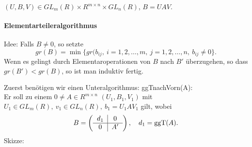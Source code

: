 \documentclass[a4paper,twoside,DIV15,BCOR12mm]{scrbook}
\begin{document}

$(U,B,V) \in GL_m(R) \times R^{m\times n} \times GL_n(R)$, $B=UAV$.
\paragraph{Elementarteileralgorithmus} Idee: Falls $B \neq 0$, so
setzte
\[
    gr(B)=\min\{gr(b_{ij},\ i=1,2,\dotsc,m,\ j=1,2,\dotsc,n,\
    b_{ij}\neq 0 \}.
\]
Wenn es gelingt durch Elementaroperationen von $B$ nach $B'$
überzugehen, so dass $gr(B')<gr(B)$, so ist man induktiv fertig.

Zuerst benötigen wir einen Unteralgorithmus: ggTnachVorn(A):\\
Er soll zu einem $0\neq A \in R^{m\times n}$ $(U_1,B_1,V_1)$ mit
$U_1\in GL_m(R),\ v_1\in GL_n(R),\ b_1=U_1 A V_1$ gilt, wobei
\[
    B=\left(\begin{tabular}{c|c} $d_1$& 0\\\hline 0 & $A'$
    \end{tabular}\right),\quad d_1=\ggt(A).
\]
Skizze:\\
\end{document}
